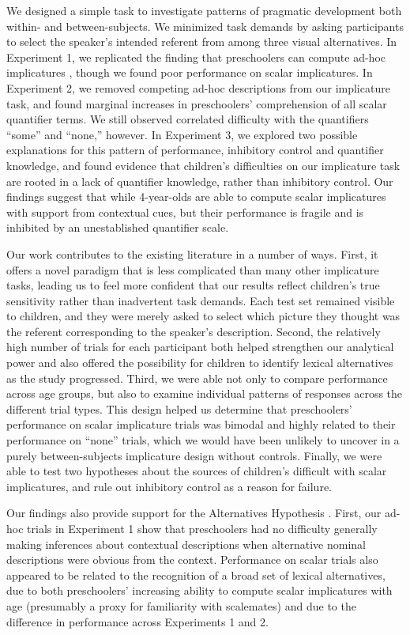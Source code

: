 \documentclass[man]{apa2}
\begin{document}
{We designed a simple task to investigate patterns of pragmatic development both within- and between-subjects. We minimized task demands by asking participants to select the speaker's intended referent from among three visual alternatives. In Experiment 1, we replicated the finding that preschoolers can compute ad-hoc implicatures \cite{stiller2014}, though we found poor performance on scalar implicatures. In Experiment 2, we removed competing ad-hoc descriptions from our implicature task, and found marginal increases in preschoolers' comprehension of all scalar quantifier terms. We still observed correlated difficulty with the quantifiers ``some'' and ``none,'' however. In Experiment 3, we explored two possible explanations for this pattern of performance, inhibitory control and quantifier knowledge, and found evidence that children's difficulties on our implicature task are rooted in a lack of quantifier knowledge, rather than inhibitory control. Our findings suggest that while 4-year-olds are able to compute scalar implicatures with support from contextual cues, but their performance is fragile and is inhibited by an unestablished quantifier scale.

Our work contributes to the existing literature in a number of ways. First, it offers a novel paradigm that is less complicated than many other implicature tasks, leading us to feel more confident that our results reflect children's true sensitivity rather than inadvertent task demands. Each test set remained visible to children, and they were merely asked to select which picture they thought was the referent corresponding to the speaker's description. Second, the relatively high number of trials for each participant both helped strengthen our analytical power and also offered the possibility for children to identify lexical alternatives as the study progressed. Third, we were able not only to compare performance across age groups, but also to examine individual patterns of responses across the different trial types. This design helped us determine that preschoolers' performance on scalar implicature trials was bimodal and highly related to their performance on ``none'' trials, which we would have been unlikely to uncover in a purely between-subjects implicature design without controls. Finally, we were able to test two hypotheses about the sources of children's difficult with scalar implicatures, and rule out inhibitory control as a reason for failure.

Our findings also provide support for the Alternatives Hypothesis \cite{barner2010,barner2011}. First, our ad-hoc trials in Experiment 1 show that preschoolers had no difficulty generally making inferences about contextual descriptions when alternative nominal descriptions were obvious from the context. Performance on scalar trials also appeared to be related to the recognition of a broad set of lexical alternatives, due to both preschoolers' increasing ability to compute scalar implicatures with age (presumably a proxy for familiarity with scalemates) and due to the difference in performance across Experiments 1 and 2. 

}
\end{document}
